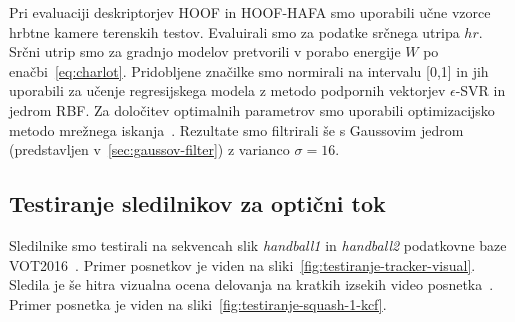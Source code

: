 Pri evaluaciji deskriptorjev HOOF in HOOF-HAFA smo uporabili učne vzorce hrbtne kamere terenskih testov. Evaluirali smo za podatke srčnega utripa $hr$. Srčni utrip smo za gradnjo modelov pretvorili v porabo energije $W$ po enačbi~\eqref{eq:charlot}. Pridobljene značilke smo normirali na intervalu [0,1] in jih uporabili za učenje regresijskega modela z metodo podpornih vektorjev $\epsilon$-SVR in jedrom RBF. Za določitev optimalnih parametrov %
smo uporabili optimizacijsko metodo mrežnega iskanja~\cite{hsu2003practical}. Rezultate smo filtrirali še s Gaussovim jedrom (predstavljen v~\ref{sec:gaussov-filter}) z varianco $\sigma=16$. 

\subsection{Testiranje sledilnikov za optični tok}\label{sec:testiranje-sledilnikov-za-opticni-tok}
Sledilnike smo testirali na sekvencah slik \textit{handball1} in \textit{handball2} podatkovne baze VOT2016~\cite{kristan2016visual}. Primer posnetkov je viden na sliki~\ref{fig:testiranje-tracker-visual}. Sledila je še hitra vizualna ocena delovanja na kratkih izsekih video posnetka~\cite{squashtv2014squash}. Primer posnetka je viden na sliki~\ref{fig:testiranje-squash-1-kcf}.


